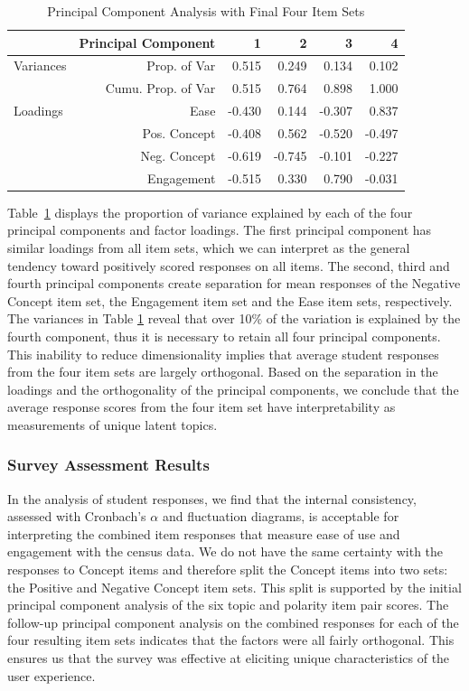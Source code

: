 \documentclass[11pt]{isuthesis}\usepackage[]{graphicx}\usepackage[]{color}
\begin{document}
\begin{table}[hbtp]
\centering
\begin{tabular}{lrrrrr}
\hline 
& Principal Component & 1 & 2 & 3 & 4 \\ 
\hline
Variances \hspace{.1in} & Prop. of Var & 0.515 & 0.249  & 0.134 & 0.102  \\
& Cumu. Prop. of Var & 0.515 & 0.764  & 0.898 & 1.000  \\
\hline
Loadings & Ease & -0.430 & 0.144 & -0.307 & 0.837\\
& Pos. Concept &  -0.408 & 0.562 & -0.520 & -0.497\\
& Neg. Concept &  -0.619 & -0.745 & -0.101 & -0.227\\
& Engagement &  -0.515 & 0.330 & 0.790 & -0.031\\
\hline
\end{tabular}
\caption{Principal Component Analysis with Final Four Item Sets} 
\label{pctable}
\end{table}

Table~\ref{pctable} displays the proportion of variance explained by each of the four principal components and factor loadings. The first principal component has similar loadings from all item sets, which we can interpret as the general tendency toward positively scored responses on all items. The second, third and fourth principal components create separation for mean responses of the Negative Concept item set, the Engagement item set and the Ease item sets, respectively. The variances in Table \ref{pctable} reveal that over 10\% of the variation is explained by the fourth component, thus it is necessary to retain all four principal components. This inability to reduce dimensionality implies that average student responses from the four item sets are largely orthogonal. Based on the separation in the loadings and the orthogonality of the principal components, we conclude that the average response scores from the four item set have interpretability as measurements of unique latent topics. 


\subsubsection{Survey Assessment Results} 

In the analysis of student responses, we find that the internal consistency, assessed with Cronbach's $\alpha$ and fluctuation diagrams, is acceptable for interpreting the combined item responses that measure ease of use and engagement with the census data. We do not have the same certainty with the responses to Concept items and therefore split the Concept items into two sets: the Positive and Negative Concept item sets. This split is supported by the initial principal component analysis of the six topic and polarity item pair scores. The follow-up principal component analysis on the combined responses for each of the four resulting item sets indicates that the factors were all fairly orthogonal. This ensures us that the survey was effective at eliciting unique characteristics of the user experience.
\end{document}
